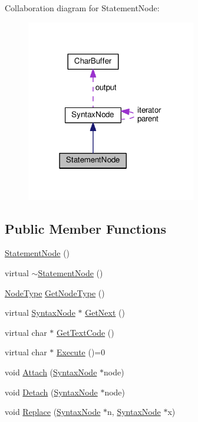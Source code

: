 Collaboration diagram for Statement\+Node\+:
\nopagebreak
\begin{figure}[H]
\begin{center}
\leavevmode
\includegraphics[width=210pt]{d7/d96/classStatementNode__coll__graph}
\end{center}
\end{figure}
\subsection*{Public Member Functions}
\begin{DoxyCompactItemize}
\item 
\hyperlink{classStatementNode_a586026d6009a39d087792d621de86360}{Statement\+Node} ()
\item 
virtual \hyperlink{classStatementNode_a56eb628750a4bf9506eb24380876ae08}{$\sim$\+Statement\+Node} ()
\item 
\hyperlink{nodes_8h_acac9cbaeea226ed297804c012dc12b16}{Node\+Type} \hyperlink{classStatementNode_acde95037b93e7154cae2ce176b155bb3}{Get\+Node\+Type} ()
\item 
virtual \hyperlink{classSyntaxNode}{Syntax\+Node} $\ast$ \hyperlink{classStatementNode_a40b21f16cdb3b0e480b552007368f176}{Get\+Next} ()
\item 
virtual char $\ast$ \hyperlink{classStatementNode_a51c8ea87d60a7a28a4a823bfa7851942}{Get\+Text\+Code} ()
\item 
virtual char $\ast$ \hyperlink{classStatementNode_a721589622c930c010927b9a9c55b173e}{Execute} ()=0
\item 
void \hyperlink{classStatementNode_a9467acb7f6c6c6c0027637475e94fba2}{Attach} (\hyperlink{classSyntaxNode}{Syntax\+Node} $\ast$node)
\item 
void \hyperlink{classStatementNode_a68b34bad1cf1a5d9281cd055760e9fec}{Detach} (\hyperlink{classSyntaxNode}{Syntax\+Node} $\ast$node)
\item 
void \hyperlink{classStatementNode_a713efe48098d7f07c6014ca7ba337553}{Replace} (\hyperlink{classSyntaxNode}{Syntax\+Node} $\ast$n, \hyperlink{classSyntaxNode}{Syntax\+Node} $\ast$x)
\end{DoxyCompactItemize}
